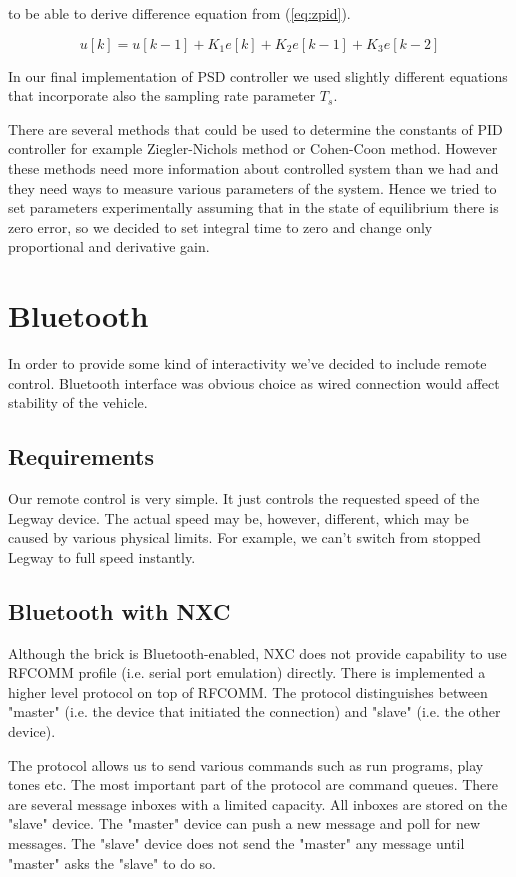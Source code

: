 \documentclass{article}
\begin{document}
\noindent to be able to derive difference equation from (\ref{eq:zpid}).

\begin{equation}
    u[k] = u[k-1] + K_1e[k]+K_2e[k-1]+K_3e[k-2]
\end{equation}

In our final implementation of PSD controller we used slightly different
equations that incorporate also the sampling rate parameter $T_s$. \cite{tar}

There are several methods that could be used to determine the constants of PID
controller for example Ziegler-Nichols method or Cohen-Coon method. However
these methods need more information about controlled system than we had and they
need ways to measure various parameters of the system. Hence we tried to set
parameters experimentally assuming that in the state of equilibrium there is
zero error, so we decided to set integral time to zero and change only
proportional and derivative gain.

\section{Bluetooth}

In order to provide some kind of interactivity we've decided to include remote control. Bluetooth interface was obvious choice as wired connection would affect stability of the vehicle.

\subsection{Requirements}
Our remote control is very simple. It just controls the requested speed of the Legway device. The actual speed may be, however, different, which may be caused by various physical limits. For example, we can't switch from stopped Legway to full speed instantly.

\subsection{Bluetooth with NXC}

Although the brick is Bluetooth-enabled, NXC does not provide capability to use RFCOMM profile (i.e. serial port emulation) directly. There is implemented a higher level protocol on top of RFCOMM. The protocol distinguishes between "master" (i.e. the device that initiated the connection) and "slave" (i.e. the other device).

The protocol allows us to send various commands such as run programs, play tones etc. The most important part of the protocol are command queues. There are several message inboxes with a limited capacity. All inboxes are stored on the "slave" device. The "master" device can push a new message and poll for new messages. The "slave" device does not send the "master" any message until "master" asks the "slave" to do so. \cite{nxt-bt}
\end{document}
